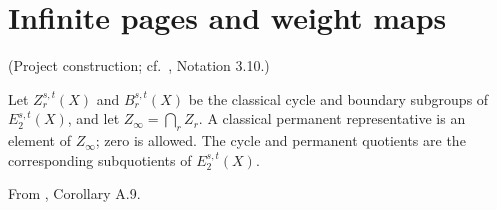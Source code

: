 \section{Infinite pages and weight maps}


\begin{proposition}
\label{sem:Literature:infinite-nu-window}
(Project construction; cf.\ \cite{LWX126}, Notation 3.10.)\par{}

Let $Z_r^{s,t}(X)$ and $B_r^{s,t}(X)$ be the classical cycle and boundary subgroups of $E_2^{s,t}(X)$, and let $Z_\infty=\bigcap_r Z_r$. A classical permanent representative is an element of $Z_\infty$; zero is allowed. The cycle and permanent quotients are the corresponding subquotients of $E_2^{s,t}(X)$.

From \cite{BHS}, Corollary A.9.\par


\end{proposition}
